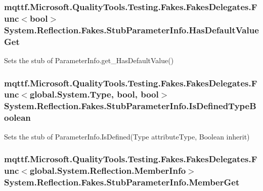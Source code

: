 \hypertarget{class_system_1_1_reflection_1_1_fakes_1_1_stub_parameter_info_a2ebc17c31e84d0f9c932a405054bca3a}{
\subsubsection[{Has\-Default\-Value\-Get}]{\setlength{\rightskip}{0pt plus 5cm}mqttf.\-Microsoft.\-Quality\-Tools.\-Testing.\-Fakes.\-Fakes\-Delegates.\-Func$<$bool$>$ System.\-Reflection.\-Fakes.\-Stub\-Parameter\-Info.\-Has\-Default\-Value\-Get}}\label{class_system_1_1_reflection_1_1_fakes_1_1_stub_parameter_info_a2ebc17c31e84d0f9c932a405054bca3a}


Sets the stub of Parameter\-Info.\-get\-\_\-\-Has\-Default\-Value()

\hypertarget{class_system_1_1_reflection_1_1_fakes_1_1_stub_parameter_info_af3718702fc6351abc57e2a1a31c969d1}{
\subsubsection[{Is\-Defined\-Type\-Boolean}]{\setlength{\rightskip}{0pt plus 5cm}mqttf.\-Microsoft.\-Quality\-Tools.\-Testing.\-Fakes.\-Fakes\-Delegates.\-Func$<$global.\-System.\-Type, bool, bool$>$ System.\-Reflection.\-Fakes.\-Stub\-Parameter\-Info.\-Is\-Defined\-Type\-Boolean}}\label{class_system_1_1_reflection_1_1_fakes_1_1_stub_parameter_info_af3718702fc6351abc57e2a1a31c969d1}


Sets the stub of Parameter\-Info.\-Is\-Defined(\-Type attribute\-Type, Boolean inherit)

\hypertarget{class_system_1_1_reflection_1_1_fakes_1_1_stub_parameter_info_adcf5003a71e44970f04a98ab3a69ad4d}{
\subsubsection[{Member\-Get}]{\setlength{\rightskip}{0pt plus 5cm}mqttf.\-Microsoft.\-Quality\-Tools.\-Testing.\-Fakes.\-Fakes\-Delegates.\-Func$<$global.\-System.\-Reflection.\-Member\-Info$>$ System.\-Reflection.\-Fakes.\-Stub\-Parameter\-Info.\-Member\-Get}}\label{class_system_1_1_reflection_1_1_fakes_1_1_stub_parameter_info_adcf5003a71e44970f04a98ab3a69ad4d}


